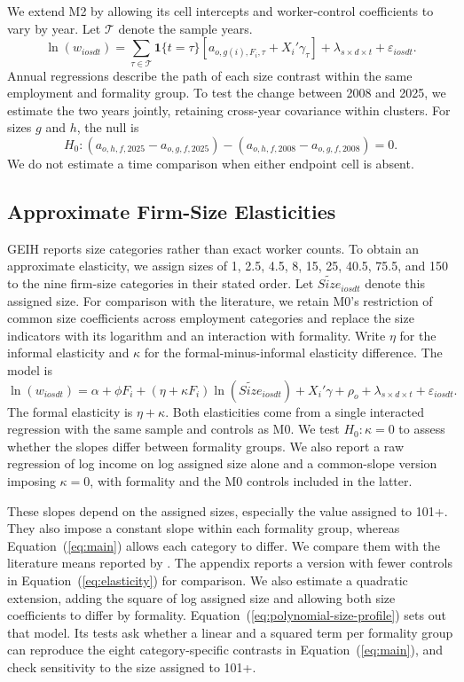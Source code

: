 We extend M2 by allowing its cell intercepts and worker-control coefficients
to vary by year. Let \(\mathcal T\) denote the sample years.
\begin{equation}\label{eq:preferred-dynamics}
  \ln(w_{iosdt}) =
  \sum_{\tau\in\mathcal T}\mathbf{1}\{t=\tau\}
  \left[a_{o,g(i),F_i,\tau}+X_i'\gamma_\tau\right]
  +\lambda_{s\times d\times t}+\varepsilon_{iosdt}.
\end{equation}
Annual regressions describe the path of each size contrast within the same
employment and formality group. To test the change between 2008 and 2025,
we estimate the two years jointly, retaining cross-year covariance within
clusters. For sizes \(g\) and \(h\), the null is
\[
H_0:(a_{o,h,f,2025}-a_{o,g,f,2025})
    -(a_{o,h,f,2008}-a_{o,g,f,2008})=0.
\]
We do not estimate a time comparison when either endpoint cell is absent.

\subsection{Approximate Firm-Size Elasticities}

GEIH reports size categories rather than exact worker
counts. To obtain an approximate elasticity, we assign sizes of 1, 2.5,
4.5, 8, 15, 25, 40.5, 75.5, and 150 to the nine firm-size categories in
their stated order. Let \(\widetilde{Size}_{iosdt}\) denote this assigned size.
For comparison with the literature, we retain M0's restriction of common
size coefficients across employment categories and replace the size
indicators with its logarithm and an interaction with formality. Write \(\eta\) for the informal elasticity and \(\kappa\) for
the formal-minus-informal elasticity difference. The model is
\begin{equation}\label{eq:preferred-elasticity}
  \ln(w_{iosdt})=\alpha+\phi F_i
  +(\eta+\kappa F_i)\ln(\widetilde{Size}_{iosdt})
  +X_i'\gamma+\rho_o+\lambda_{s\times d\times t}
  +\varepsilon_{iosdt}.
\end{equation}
The formal elasticity is \(\eta+\kappa\). Both elasticities come from a single interacted regression
with the same sample and controls as M0. We test
\(H_0:\kappa=0\) to assess whether the slopes differ between formality groups. We also
report a raw regression of log income on log assigned size alone and a
common-slope version imposing
\(\kappa=0\), with formality and the M0 controls included in the latter.

These slopes depend on the assigned sizes, especially the value
assigned to 101+. They also impose a constant slope within each formality
group, whereas Equation~(\ref{eq:main}) allows each category to differ.
We compare them with the literature means reported by
\citet{DiegmannMullerSchoefer2026}. The appendix
reports a version with fewer controls in Equation~(\ref{eq:elasticity}) for
comparison. We also estimate a quadratic extension, adding the square of log
assigned size and allowing both size coefficients to differ by formality.
Equation~(\ref{eq:polynomial-size-profile}) sets out that model. Its tests ask
whether a linear and a squared term per formality group can reproduce the
eight category-specific contrasts in Equation~(\ref{eq:main}), and check
sensitivity to the size assigned to 101+.

